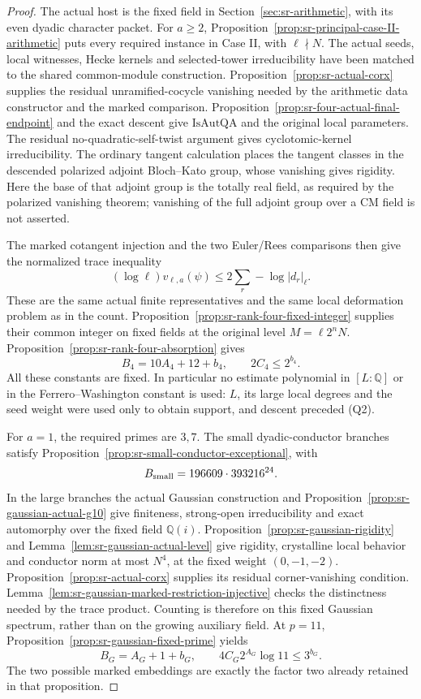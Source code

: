 \begin{proof}
The actual host is the fixed field in
Section~\ref{sec:sr-arithmetic}, with its even dyadic
character packet.
For \(a\ge2\),
Proposition~\ref{prop:sr-principal-case-II-arithmetic}
puts every required instance in Case II, with
\(\ell\nmid N\).
The actual seeds, local witnesses, Hecke kernels and
selected-tower irreducibility have been matched to the
shared common-module construction.
Proposition~\ref{prop:sr-actual-corx} supplies the
residual unramified-cocycle vanishing needed by the
arithmetic data constructor and the marked comparison.
Proposition~\ref{prop:sr-four-actual-final-endpoint}
and the exact descent give \(\mathrm{IsAutQA}\) and the
original local parameters.
The residual no-quadratic-self-twist argument gives
cyclotomic-kernel irreducibility.
The ordinary tangent calculation places the tangent
classes in the descended polarized adjoint
Bloch--Kato group, whose vanishing gives rigidity.
Here the base of that adjoint group is the totally
real field, as required by the polarized vanishing
theorem; vanishing of the full adjoint group over
a CM field is not asserted.

The marked cotangent injection and the two Euler/Rees
comparisons then give the normalized trace inequality
\[
 (\log\ell)v_{\ell,a}(\psi)
                     \le2\sum_r-\log|d_r|_\ell.
 \tag{Q7}
\]
These are the same actual finite representatives and
the same local deformation problem as in the count.
Proposition~\ref{prop:sr-rank-four-fixed-integer}
supplies their common integer on fixed fields at
the original level \(M=\ell2^nN\).
Proposition~\ref{prop:sr-rank-four-absorption} gives
\[
 B_4=10A_4+12+b_4,\qquad 2C_4\le2^{b_4}.
\]
All these constants are fixed.
In particular no estimate polynomial in \([L:\mathbb Q]\)
or in the Ferrero--Washington constant is used:
\(L\), its large local degrees and the seed weight
were used only to obtain support, and descent preceded
(Q2).

For \(a=1\), the required primes are \(3,7\).
The small dyadic-conductor branches satisfy
Proposition~\ref{prop:sr-small-conductor-exceptional},
with
\[
 B_{\rm small}=196609\cdot393216^{24}.
\]
In the large branches the actual Gaussian construction
and Proposition~\ref{prop:sr-gaussian-actual-g10}
give finiteness,
strong-open irreducibility and exact automorphy over
the fixed field \(\mathbb Q(i)\).
Proposition~\ref{prop:sr-gaussian-rigidity}
and Lemma~\ref{lem:sr-gaussian-actual-level} give
rigidity, crystalline local behavior and conductor
norm at most \(N^4\), at the fixed weight
\((0,-1,-2)\).
Proposition~\ref{prop:sr-actual-corx} supplies its
residual corner-vanishing condition.
Lemma~\ref{lem:sr-gaussian-marked-restriction-injective}
checks the distinctness needed by the trace product.
Counting is therefore on this fixed Gaussian spectrum,
rather than on the growing auxiliary field.
At \(p=11\),
Proposition~\ref{prop:sr-gaussian-fixed-prime} yields
\[
 B_G=A_G+1+b_G,\qquad
                      4C_G2^{A_G}\log11\le3^{b_G}.
\]
The two possible marked embeddings are exactly the
factor two already retained in that proposition.


\end{proof}
